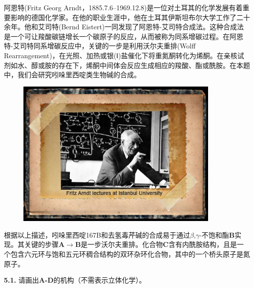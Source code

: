 阿恩特(Fritz Georg Arndt，1885.7.6--1969.12.8)是一位对土耳其的化学发展有着重要影响的德国化学家。在他的职业生涯中，他在土耳其伊斯坦布尔大学工作了二十余年。他和艾司特(Bernd Eistert)一同发现了阿恩特-艾司特合成法。这种合成法是一个可让羧酸碳链增长一个碳原子的反应，从而被称为同系增碳过程。在阿恩特-艾司特同系增碳反应中，关键的一步是利用沃尔夫重排(Wolff Rearrangement)，在光照、加热或银(Ⅰ)盐催化下将重氮酮转化为烯酮。在亲核试剂如水、醇或胺的存在下，烯酮中间体会反应生成相应的羧酸、酯或酰胺。在本题中，我们会研究吲哚里西啶类生物碱的合成。

\begin{figure}[h]
	\centering
	\includegraphics[width=10cm]{./pic/t5-1.jpg}
\end{figure}

根据以上描述，吲哚里西啶167B和去氢毒芹碱的合成易于通过$\beta$,$\gamma$-不饱和酯\textbf{B}实现。其关键的步骤\textbf{A}$\rightarrow$\textbf{B}是一步沃尔夫重排。化合物\textbf{C}含有内酰胺结构，且是一个包含六元环与饱和五元环稠合结构的双环杂环化合物，其中的一个桥头原子是氮原子。

\noindent\textbf{5.1.} 请画出\textbf{A-D}的机构（不需表示立体化学）。

